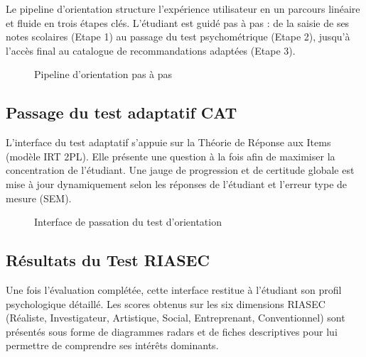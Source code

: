 Le pipeline d'orientation structure l'expérience utilisateur en un parcours linéaire et fluide en trois étapes clés. L'étudiant est guidé pas à pas : de la saisie de ses notes scolaires (Etape 1) au passage du test psychométrique (Etape 2), jusqu'à l'accès final au catalogue de recommandations adaptées (Etape 3).

\begin{figure}[H]
    \centering
    \caption{Pipeline d'orientation pas à pas}
    \label{fig:interface_pipeline_orientation}
\end{figure}

\subsection{Passage du test adaptatif CAT}

L'interface du test adaptatif s'appuie sur la Théorie de Réponse aux Items (modèle IRT 2PL). Elle présente une question à la fois afin de maximiser la concentration de l'étudiant. Une jauge de progression et de certitude globale est mise à jour dynamiquement selon les réponses de l'étudiant et l'erreur type de mesure (SEM).

\begin{figure}[H]
    \centering
    \caption{Interface de passation du test d'orientation}
    \label{fig:interface_passage_test}
\end{figure}

\subsection{Résultats du Test RIASEC}

Une fois l'évaluation complétée, cette interface restitue à l'étudiant son profil psychologique détaillé. Les scores obtenus sur les six dimensions RIASEC (Réaliste, Investigateur, Artistique, Social, Entreprenant, Conventionnel) sont présentés sous forme de diagrammes radars et de fiches descriptives pour lui permettre de comprendre ses intérêts dominants.

